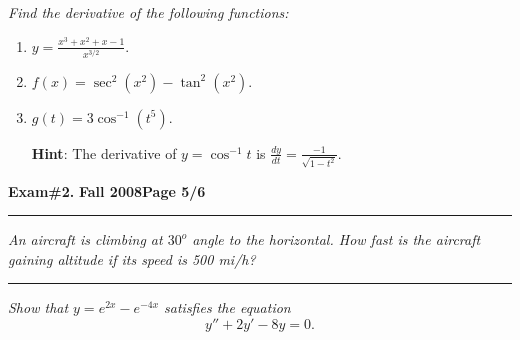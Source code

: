\documentclass[12pt]{article}
\begin{document}
\bigskip
{\problem[30 pts] \em Find the derivative of the following functions:}
\begin{enumerate}
\item $\displaystyle{y = \frac{x^3 + x^2 + x - 1}{x^{3/2}}}$.
\vspace{4cm}
\begin{flushright}
\end{flushright}
\item $f(x) = \sec^2 (x^2) - \tan^2 (x^2)$.
\vspace{4cm}
\begin{flushright}
\end{flushright}
\item $g(t) = 3\cos^{-1}(t^5)$.

\noindent
{\bf Hint}: The derivative of $y=\cos^{-1}t$ is $\displaystyle{\frac{dy}{dt}} = \frac{-1}{\sqrt{1-t^2}}$.
\vspace{4cm}
\begin{flushright}
\end{flushright}
\end{enumerate}
\newpage

\hfill{\large\bf Exam\#2.}\hfill{\large\bf
  Fall 2008}\hfill{\large\bf Page 5/6}\hrule

\bigskip
{\problem[10 pts] \em An aircraft is climbing at $30^o$ angle to the horizontal.  How fast is the aircraft gaining altitude if its speed is 500 mi/h?}
\vspace{10cm}
\begin{flushright}
\end{flushright}
\hrule
{\problem[10 pts] \em Show that $y=e^{2x} - e^{-4x}$ satisfies the equation}
\begin{equation*}
y'' + 2y' -8y = 0.
\end{equation*}
\newpage
\end{document}

